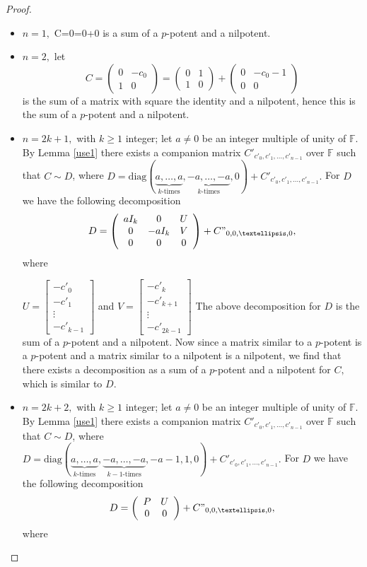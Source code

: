 \documentclass[10pt,a4paper]{amsart}
\newcommand{\F}{\mathbb{F}}
\newcommand{\diag}{\mathrm{diag}}
\begin{document}
\begin{proof}

\begin{itemize}
\item $n=1,$ C=0=0+0 is a sum of a $p$-potent and a nilpotent.
\item $n=2,$ let $$C=\left(\begin{array}{cc}
0 & -c_0 \\
1 & 0
\end{array}\right)=\left(\begin{array}{cc}
0 & 1 \\
1 & 0
\end{array}\right)+\left(\begin{array}{cc}
0 & -c_0-1 \\
0 & 0
\end{array}\right)$$ is the sum of a matrix with square the identity and a nilpotent, hence this is the sum of a $p$-potent and a nilpotent.
\item $n=2k+1,$ with $k\geq 1$ integer; let $a\neq 0$ be an integer multiple of unity of $\F.$ By Lemma \ref{use1} there exists a companion matrix $C'_{c'_0,c'_1,\ldots,c'_{n-1}}$ over $\F$ such that $C\sim D$, where $D=\diag (\underbrace{a,\dots,a }_{k \textrm{-times}} ,\underbrace{-a,\dots,-a }_{k \textrm{-times}} ,0)+C'_{c'_0,c'_1,\ldots,c'_{n-1}}.$
    For $D$ we have the following decomposition
    $$D=\left(\begin{array}{ccc}
aI_k & 0 & U \\
0 & -aI_k & V\\
0 & 0 & 0
\end{array}\right)+C"_{0,0,\dots,0},$$ where


$U=\begin{bmatrix}
   -c'_0\\
   -c'_1\\
   \vdots\\
   -c'_{k-1}
  \end{bmatrix}$
 and
 $V=\begin{bmatrix}
   -c'_k\\
   -c'_{k+1}\\
   \vdots\\
   -c'_{2k-1}
  \end{bmatrix}$
The above decomposition for $D$ is the sum of a $p$-potent and a nilpotent. Now since a matrix similar to a $p$-potent is a $p$-potent and a matrix similar to a nilpotent is a nilpotent, we find that there exists a decomposition as a sum of a $p$-potent and a nilpotent for $C,$ which is similar to $D$.
\item $n=2k+2,$ with $k\geq 1$ integer; let $a\neq 0$ be an integer multiple of unity of $\F.$ By Lemma \ref{use1} there exists a companion matrix $C'_{c'_0,c'_1,\ldots,c'_{n-1}}$ over $\F$ such that $C\sim D$, where $D=\diag (\underbrace{a,\dots,a }_{k \textrm{-times}} ,\underbrace{-a,\dots,-a }_{k-1 \textrm{-times}} ,-a-1,1,0)+C'_{c'_0,c'_1,\ldots,c'_{n-1}}.$
    For $D$ we have the following decomposition
    $$D=\left(\begin{array}{cc}
P & U \\
0 & 0
\end{array}\right)+C"_{0,0,\dots,0},$$ where


\end{itemize}
\end{proof}
\end{document}
